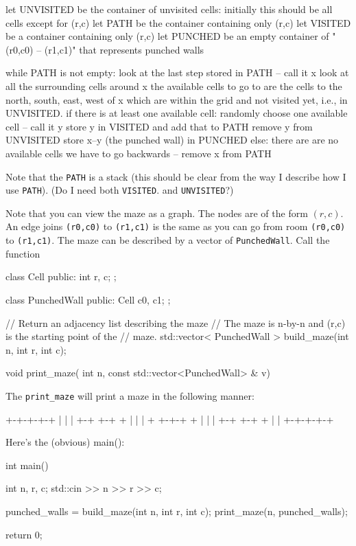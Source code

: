 \begin{ex}
\begin{console}
let UNVISITED be the container of unvisited cells:
    initially this should be all cells except for (r,c)
let PATH be the container containing only (r,c)
let VISITED be a container containing only (r,c)
let PUNCHED be an empty container of "(r0,c0) -- (r1,c1)"
    that represents punched walls

while PATH is not empty:
    look at the last step stored in PATH -- call it x
    look at all the surrounding cells around x
    the available cells to go to are the
        cells to the north, south, east, west of x
        which are within the grid and not visited yet,
        i.e., in UNVISITED.
    if there is at least one available cell:
        randomly choose one available cell -- call it y
        store y in VISITED and add that to PATH
        remove y from UNVISITED
        store x--y (the punched wall) in PUNCHED
    else:
        there are are no available cells
        we have to go backwards -- remove x from PATH 
\end{console}
Note that the \texttt{PATH} is a stack
(this should be clear from the way I describe how I use
\texttt{PATH}).
(Do I need both  \texttt{VISITED}.
and \texttt{UNVISITED}?)

Note that you can view the maze as a graph.
The nodes are of the form $(r,c)$.
An edge joins \texttt{(r0,c0)} to
\texttt{(r1,c1)} is the same as you can go from
room \texttt{(r0,c0)} to \texttt{(r1,c1)}.
The maze can be described by a vector of \texttt{PunchedWall}. 
Call the function
\begin{console}
class Cell
{
public:
    int r, c;
};

class PunchedWall
{
public:
    Cell c0, c1;
};
  
// Return an adjacency list describing the maze
// The maze is n-by-n and (r,c) is the starting point of the
// maze.
std::vector< PunchedWall > build_maze(int n,
                                      int r, int c);

void print_maze( int n, const std::vector<PunchedWall> & v)
\end{console}
The \verb!print_maze! will print a maze in the following manner:
\begin{console}
+-+-+-+-+
|   |   |
+-+ +-+ +
| |     |
+ +-+-+ +
|     | |
+-+ +-+ +
|       |
+-+-+-+-+
\end{console}
\end{ex}

Here's the (obvious) main():
\begin{console}
int main()
{
    int n, r, c;
    std::cin >> n >> r >> c;

    punched_walls = build_maze(int n, int r, int c);
    print_maze(n, punched_walls);

    return 0;
}
\end{console}
